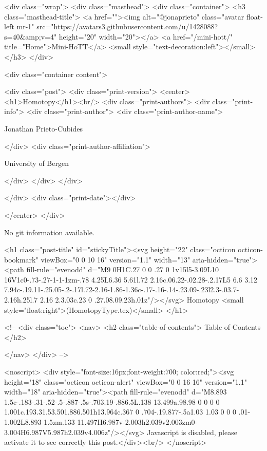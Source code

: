     <div class="wrap">
      <div class="masthead">
        <div class="container">
          <h3 class="masthead-title">
            <a href=""><img alt="@jonaprieto" class="avatar float-left mr-1" src="https://avatars3.githubusercontent.com/u/1428088?s=40&amp;v=4" height="20" width="20"></a>
            <a href="/mini-hott/" title="Home">Mini-HoTT</a>
            <small style="text-decoration:left"></small>
          </h3>
        </div>
      
      <div class="container content">
        







<div class="post">
  <div class="print-version">
    <center>
      <h1>Homotopy</h1><br/>
        <div class="print-authors">
          <div class="print-info">
            <div class="print-author">
              <div class="print-author-name">
                
                  Jonathan Prieto-Cubides
                
              </div>
              <div class="print-author-affiliation">
                
                  University of Bergen
                
                </div>
            </div>
          </div>
          
          
        </div>
        <div class="print-date"></div>
        
        
    </center>
  </div>

  
  No git information available.
  

  <h1 class="post-title" id="stickyTitle"><svg height="22" class="octicon octicon-bookmark" viewBox="0 0 10 16" version="1.1" width="13" aria-hidden="true"><path fill-rule="evenodd" d="M9 0H1C.27 0 0 .27 0 1v15l5-3.09L10 16V1c0-.73-.27-1-1-1zm-.78 4.25L6.36 5.61l.72 2.16c.06.22-.02.28-.2.17L5 6.6 3.12 7.94c-.19.11-.25.05-.2-.17l.72-2.16-1.86-1.36c-.17-.16-.14-.23.09-.23l2.3-.03.7-2.16h.25l.7 2.16 2.3.03c.23 0 .27.08.09.23h.01z"/></svg> Homotopy <small style="float:right">(HomotopyType.tex)</small>
  </h1>

  <!-- 
  <div class="toc">
    <nav>
    <h2 class="table-of-contents"> Table of Contents </h2>
      

    </nav>
  </div>
   -->

  <noscript>
  <div style="font-size:16px;font-weight:700; color:red;"><svg height="18" class="octicon octicon-alert" viewBox="0 0 16 16" version="1.1" width="18" aria-hidden="true"><path fill-rule="evenodd" d="M8.893 1.5c-.183-.31-.52-.5-.887-.5s-.703.19-.886.5L.138 13.499a.98.98 0 0 0 0 1.001c.193.31.53.501.886.501h13.964c.367 0 .704-.19.877-.5a1.03 1.03 0 0 0 .01-1.002L8.893 1.5zm.133 11.497H6.987v-2.003h2.039v2.003zm0-3.004H6.987V5.987h2.039v4.006z"/></svg> Javascript is disabled, please activate it to see correctly this post.</div><br/>
  </noscript>

